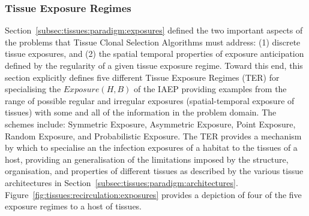 %
%
\subsubsection{Tissue Exposure Regimes}
Section~\ref{subsec:tissues:paradigm:exposures} defined the two important aspects of the problems that Tissue Clonal Selection Algorithms must address: (1) discrete tissue exposures, and (2) the spatial temporal properties of exposure anticipation defined by the regularity of a given tissue exposure regime. Toward this end, this section explicitly defines five different Tissue Exposure Regimes (TER) for specialising the $Exposure(H, B)$ of the IAEP providing examples from the range of possible regular and irregular exposures (spatial-temporal exposure of tissues) with some and all of the information in the problem domain. The schemes include: Symmetric Exposure, Asymmetric Exposure, Point Exposure, Random Exposure, and Probabilistic Exposure. The TER provides a mechanism by which to specialise an the infection exposures of a habitat to the tissues of a host, providing an generalisation of the limitations imposed by the structure, organisation, and properties of different tissues as described by the various tissue architectures in Section~\ref{subsec:tissues:paradigm:architectures}. Figure~\ref{fig:tissues:recirculation:exposures} provides a depiction of four of the five exposure regimes to a host of tissues.

